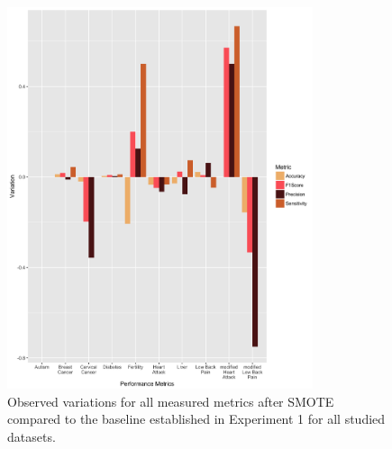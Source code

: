 \begin{figure}[!htbp]
    \centering
    \includegraphics[width=0.8\textwidth]{ThesisTemplate/usingLatex/chapter5Images/OverVariations.png}
    \caption{Observed variations for all measured metrics after SMOTE compared to the baseline established in Experiment 1 for all studied datasets.}
    \label{fig:smoteVar}
\end{figure}

